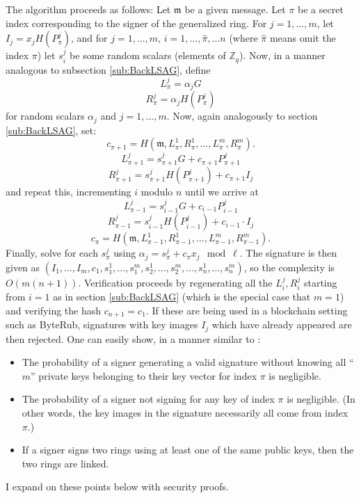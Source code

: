 \documentclass[12pt,oneside,english]{amsart}
\numberwithin{equation}{section}
\numberwithin{figure}{section}
\theoremstyle{plain}
\theoremstyle{plain}
\theoremstyle{remark}
\theoremstyle{plain}
\theoremstyle{remark}
\theoremstyle{remark}
\theoremstyle{plain}
\theoremstyle{definition}
\begin{document}
The algorithm proceeds as follows: Let $\mathfrak{m}$ be a given
message. Let $\pi$ be a secret index corresponding to the signer
of the generalized ring. For $j=1,...,m$, let $I_{j}=x_{j}H\left(P_{\pi}^{j}\right)$,
and for $j=1,...,m$, $i=1,...,\hat{\pi},...n$ (where $\hat{\pi}$
means omit the index $\pi$) let $s_{i}^{j}$ be some random scalars (elements of $\mathbb{Z}_q$).
Now, in a manner analogous to subsection \ref{sub:BackLSAG},
define 
\[
L_{\pi}^{j}=\alpha_{j}G
\]
\[
R_{\pi}^{j}=\alpha_{j}H\left(P_{\pi}^{j}\right)
\]
 for random scalars $\alpha_j$ and $j=1,...,m$. Now, again analogously
to section \ref{sub:BackLSAG}, set:
\[
c_{\pi+1}=H\left(\mathfrak{m},L_{\pi}^{1},R_{\pi}^{1},...,L_{\pi}^{m},R_{\pi}^{m}\right).
\]
\[
L_{\pi+1}^{j}=s_{\pi+1}^{j}G+c_{\pi+1}P_{\pi+1}^{j}
\]
\[
R_{\pi+1}^{j}=s_{\pi+1}^{j}H\left(P_{\pi+1}^{j}\right)+c_{\pi+1}I_{j}
\]
 and repeat this, incrementing $i$ modulo $n$ until we arrive at
\[
L_{\pi-1}^{j}=s_{i-1}^{j}G+c_{i-1}P_{i-1}^{j}
\]
\[
R_{\pi-1}^{j}=s_{i-1}^{j}H\left(P_{i-1}^{j}\right)+c_{i-1}\cdot I_{j}
\]
\[
c_{\pi}=H\left(\mathfrak{m},L_{\pi-1}^{1},R_{\pi-1}^{1},...,L_{\pi-1}^{m},R_{\pi-1}^{m}\right).
\]
 Finally, solve for each $s_{\pi}^{j}$ using $\alpha_{j}=s_{\pi}^{j}+c_{\pi}x_{j} \mod \ell$.
The signature is then given as $\left(I_{1},...,I_{m},c_{1},s_{1}^{1},...,s_{1}^{m},s_{2}^{1},...,s_{2}^{m},...,s_{n}^{1},...,s_{n}^{m}\right)$,
so the complexity is $O\left(m\left(n+1\right)\right).$ 
Verification
proceeds by regenerating all the $L_{i}^{j},R_{i}^{j}$ starting from
$i=1$ as in section \ref{sub:BackLSAG} (which is the special case that $m=1$) and verifying
the hash $c_{n+1}=c_{1}.$ 
If these are being used in a blockchain setting such as ByteRub, signatures with key images $I_j$ which have already appeared are then rejected. 
One can easily show, in a manner similar to \cite{LWW}: 
\begin{itemize}
\item The probability of a signer generating a valid signature without knowing
all ``$m$'' private keys belonging to their key vector for index $\pi$ is negligible. 
\item The probability of a signer not signing for any key of index $\pi$
is negligible. (In other words, the key images in the signature necessarily
all come from index $\pi$.)
\item If a signer signs two rings using at least one of the same public keys, then the two rings are linked.
\end{itemize}
I expand on these points below with security proofs. 
\end{document}
